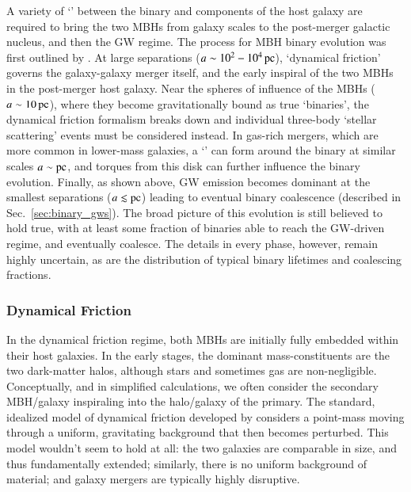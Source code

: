 \documentclass[onecolumn,authoryear]{els-mrw}
\begin{document}
A variety of `' between the binary and components of the host galaxy are required to bring the two MBHs from galaxy scales to the post-merger galactic nucleus, and then the GW regime.  The process for MBH binary evolution was first outlined by \citet{Begelman+1980}.  At large separations ($a \sim 10^2 - 10^4 \, \mathrm{pc}$), `dynamical friction' governs the galaxy-galaxy merger itself, and the early inspiral of the two MBHs in the post-merger host galaxy.  Near the spheres of influence of the MBHs ($a \sim 10 \, \mathrm{pc}$), where they become gravitationally bound as true `binaries', the dynamical friction formalism breaks down and individual three-body `stellar scattering' events must be considered instead.  In gas-rich mergers, which are more common in lower-mass galaxies, a `' can form around the binary at similar scales $a \sim \mathrm{pc}$, and torques from this disk can further influence the binary evolution.  Finally, as shown above, GW emission becomes dominant at the smallest separations ($a \lesssim \mathrm{pc}$) leading to eventual binary coalescence (described in Sec.~\ref{sec:binary_gws}).  The broad picture of this evolution is still believed to hold true, with at least some fraction of binaries able to reach the GW-driven regime, and eventually coalesce.  The details in every phase, however, remain highly uncertain, as are the distribution of typical binary lifetimes and coalescing fractions.

\subsubsection{Dynamical Friction}

In the dynamical friction regime, both MBHs are initially fully embedded within their host galaxies.  In the early stages, the dominant mass-constituents are the two dark-matter halos, although stars and sometimes gas are non-negligible.  Conceptually, and in simplified calculations, we often consider the secondary MBH/galaxy inspiraling into the halo/galaxy of the primary.  The standard, idealized model of dynamical friction developed by  \citet{Chandrasekhar-1943} considers a point-mass moving through a uniform, gravitating background that then becomes perturbed.  This model wouldn't seem to hold at all: the two galaxies are comparable in size, and thus fundamentally extended; similarly, there is no uniform background of material; and galaxy mergers are typically highly disruptive.
\end{document}

